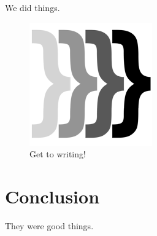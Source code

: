 We did things.

\begin{figure}[htbp]
\centering
\includegraphics{figs/codementum.png}
\caption{Get to writing!}
\end{figure}

\section{Conclusion}

They were good things\cite{codementum}.
